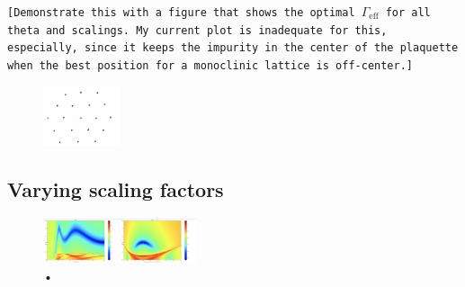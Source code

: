 \documentclass[aps,pra,superscriptaddress,twocolumn]{revtex4-1}
\newcommand{\commentSB}[1]{\texttt{\color{blue}[#1]}}
\begin{document}
\commentSB{Demonstrate this with a figure that shows the optimal $\Gamma_\text{eff}$ for all theta and scalings. My current plot is inadequate for this, especially, since it keeps the impurity in the center of the plaquette when the best position for a monoclinic lattice is off-center.} 

\begin{figure}
    \centering
    \includegraphics[width=0.2\textwidth]{figures/triangle_substitution_geometry.png}
    \label{fig:triangle_substitution_geometry}
\end{figure}

\subsection{Varying scaling factors}

\begin{figure}
    \centering
    \includegraphics[width=0.4\textwidth]{figures/mono_rect_thetadelta.png} 
    \caption{•}
    \label{fig:mono_rect_thetadelta}
\end{figure}







\end{document}
